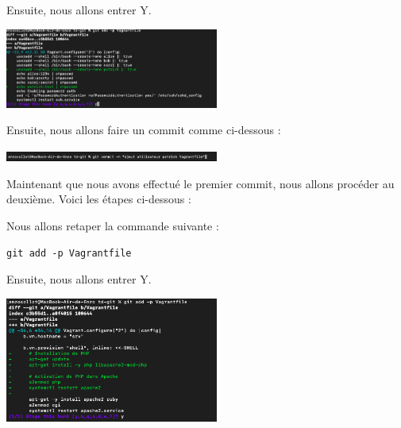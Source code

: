 \documentclass[12pt]{article}
\begin{document}
\vspace{0.3cm}

Ensuite, nous allons entrer Y.

\vspace{0.3cm}

\begin{center}
  \includegraphics[width=7cm]{Images-TD-Git/Image-TD-Git-2/git-add-1.png}
\end{center}

\vspace{0.3cm}

\newpage

Ensuite, nous allons faire un commit comme ci-dessous :

\vspace{0.3cm}

\begin{center}
  \includegraphics[width=7cm]{Images-TD-Git/Image-TD-Git-2/premier-git-commit.png}
\end{center}

\vspace{0.3cm}

Maintenant que nous avons effectué le premier commit, nous allons procéder au deuxième. Voici les étapes ci-dessous :

\vspace{0.3cm}

Nous allons retaper la commande suivante :

\texttt{git add -p Vagrantfile}

\vspace{0.3cm}

Ensuite, nous allons entrer Y.

\vspace{0.3cm}


\begin{center}
  \includegraphics[width=7cm]{Images-TD-Git/Image-TD-Git-2/git-add-2.png}
\end{center}
\end{document}
